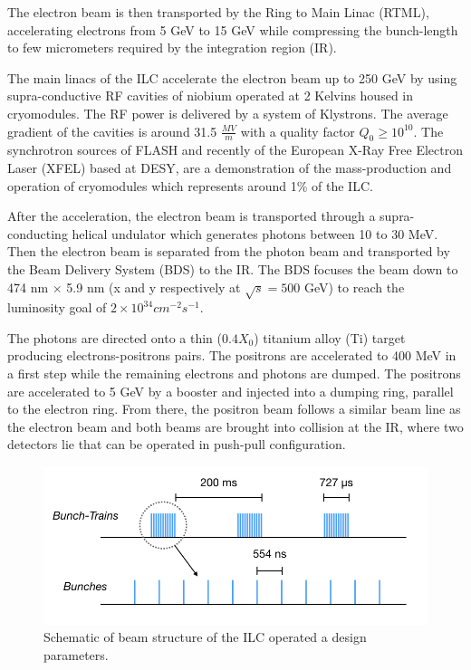 The electron beam is then transported by the Ring to Main Linac (RTML), accelerating electrons from 5 GeV to 15 GeV while compressing the bunch-length to few micrometers required by the integration region (IR).

The main linacs of the ILC accelerate the electron beam up to 250 GeV by using supra-conductive RF cavities of niobium operated at 2 Kelvins housed in cryomodules. The RF power is delivered by a system of Klystrons. The average gradient of the cavities is around 31.5 $\frac{MV}{m}$ with a quality factor $Q_0 \geqslant 10^{10}$. The synchrotron sources of FLASH and recently of the European X-Ray Free Electron Laser (XFEL) based at DESY, are a demonstration of the mass-production and operation of cryomodules which represents around 1\% of the ILC.

After the acceleration, the electron beam is transported through a supra-conducting helical undulator which generates photons between 10 to 30 MeV. Then the electron beam is separated from the photon beam and transported by the Beam Delivery System (BDS) to the IR. The BDS focuses the beam down to 474 nm $\times$ 5.9 nm (x and y respectively at $\sqrt{s} = 500$ GeV) to reach the luminosity goal of $2 \times 10^{34} cm^{-2}s^{-1}$.

The photons are directed onto a thin ($0.4 X_0$) titanium alloy (Ti) target producing electrons-positrons pairs. The positrons are accelerated to 400 MeV in a first step while the remaining electrons and photons are dumped. The positrons are accelerated to 5 GeV by a booster and injected into a dumping ring, parallel to the electron ring. From there, the positron beam follows a similar beam line as the electron beam and both beams are brought into collision at the IR, where two detectors lie that can be operated in push-pull configuration.

\begin{figure}[htbp!]
  \centering
  \includegraphics[width=0.7\linewidth]{chap2/fig/BeamStructure.jpeg}
  \caption{Schematic of beam structure of the ILC operated a design parameters.} \label{fig:ILC_BeamStruct}
\end{figure}

